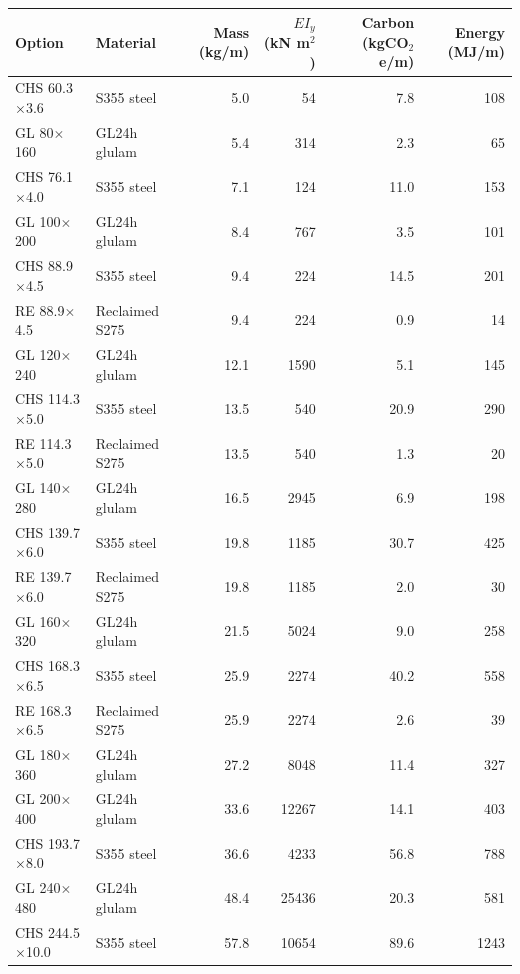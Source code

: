 \begin{tabular}{llrrrr}
\toprule
Option & Material & Mass (kg/m) & $EI_y$ (kN m$^2$) & Carbon (kgCO$_2$e/m) & Energy (MJ/m) \\
\midrule
CHS 60.3$\times$3.6 & S355 steel & 5.0 & 54 & 7.8 & 108 \\
GL 80$\times$160 & GL24h glulam & 5.4 & 314 & 2.3 & 65 \\
CHS 76.1$\times$4.0 & S355 steel & 7.1 & 124 & 11.0 & 153 \\
GL 100$\times$200 & GL24h glulam & 8.4 & 767 & 3.5 & 101 \\
CHS 88.9$\times$4.5 & S355 steel & 9.4 & 224 & 14.5 & 201 \\
RE 88.9$\times$4.5 & Reclaimed S275 & 9.4 & 224 & 0.9 & 14 \\
GL 120$\times$240 & GL24h glulam & 12.1 & 1590 & 5.1 & 145 \\
CHS 114.3$\times$5.0 & S355 steel & 13.5 & 540 & 20.9 & 290 \\
RE 114.3$\times$5.0 & Reclaimed S275 & 13.5 & 540 & 1.3 & 20 \\
GL 140$\times$280 & GL24h glulam & 16.5 & 2945 & 6.9 & 198 \\
CHS 139.7$\times$6.0 & S355 steel & 19.8 & 1185 & 30.7 & 425 \\
RE 139.7$\times$6.0 & Reclaimed S275 & 19.8 & 1185 & 2.0 & 30 \\
GL 160$\times$320 & GL24h glulam & 21.5 & 5024 & 9.0 & 258 \\
CHS 168.3$\times$6.5 & S355 steel & 25.9 & 2274 & 40.2 & 558 \\
RE 168.3$\times$6.5 & Reclaimed S275 & 25.9 & 2274 & 2.6 & 39 \\
GL 180$\times$360 & GL24h glulam & 27.2 & 8048 & 11.4 & 327 \\
GL 200$\times$400 & GL24h glulam & 33.6 & 12267 & 14.1 & 403 \\
CHS 193.7$\times$8.0 & S355 steel & 36.6 & 4233 & 56.8 & 788 \\
GL 240$\times$480 & GL24h glulam & 48.4 & 25436 & 20.3 & 581 \\
CHS 244.5$\times$10.0 & S355 steel & 57.8 & 10654 & 89.6 & 1243 \\
\bottomrule
\end{tabular}